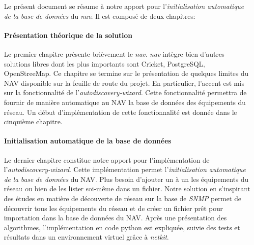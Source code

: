 Le présent document se résume à notre apport pour l'\emph{initialisation automatique de la base de données} du \emph{\gls*{nav}}. Il est composé de deux chapitres:

\paragraph{Présentation théorique de la solution\\}

Le premier chapitre présente brièvement le \emph{\gls*{nav}}. \emph{\gls*{nav}} intègre bien d'autres solutions libres dont les plus importants sont Cricket, PostgreSQL, OpenStreeMap. Ce chapitre se termine sur le présentation de quelques limites du NAV disponible sur la feuille de route du projet. En particulier, l'accent est mis sur la fonctionnalité de l'\emph{autodiscovery-wizard}. Cette fonctionnalité permettra de fournir de manière automatique au NAV la base de données des équipements du réseau. Un début d'implémentation de cette fonctionnalité est donnée dans le cinquième chapitre.

\paragraph{Initialisation automatique de la base de données\\}
Le dernier chapitre constitue notre apport pour l'implémentation de l'\emph{autodiscovery-wizard}. Cette implémentation permet l'\emph{initialisation automatique de la base de données} du NAV. Plus besoin d'ajouter un à un les équipements du réseau ou bien de les lister soi-même dans un fichier. Notre solution en s'inspirant des études en matière de découverte de réseau sur la base de \emph{SNMP} permet de découvrir tous les équipements du réseau et de créer un fichier prêt pour importation dans la base de données du NAV. Après une présentation des algorithmes, l'implémentation en code python est expliquée, suivie des tests et résultats dans un environnement virtuel grâce à  \emph{\gls*{netkit}}.

